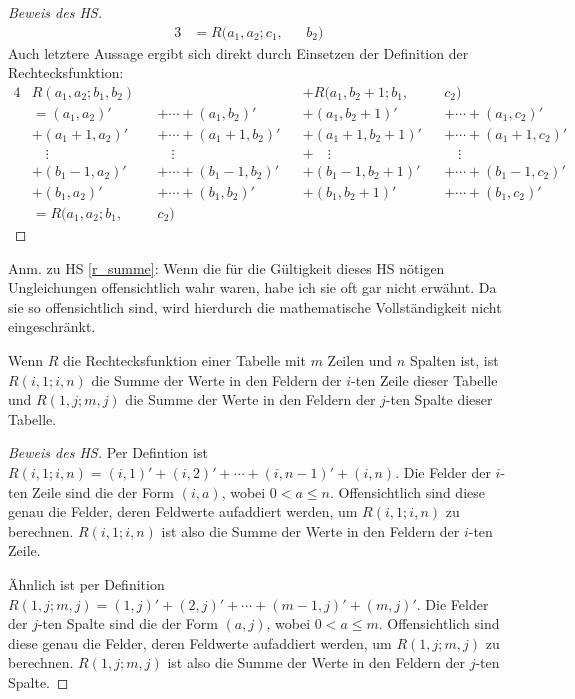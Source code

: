 \begin{proof}[Beweis des HS]
\begin{alignat*}{3}
        &=R(a_1, a_2; c_1, &&b_2)&&
    \end{alignat*}
    Auch letztere Aussage ergibt sich direkt durch Einsetzen der Definition der Rechtecksfunktion:
    \begin{alignat*}{4}
        &R(a_1, a_2; b_1, b_2)&& &&+R(a_1, b_2+1; b_1, &&c_2)\\
        &=(a_1, a_2)' &&+\cdots+ (a_1, b_2)'
        &&+(a_1, b_2+1)'&&+\cdots+(a_1, c_2)'\\
        &+(a_1+1, a_2)'&&+\cdots+ (a_1+1, b_2)'
        &&+(a_1+1, b_2+1)'&&+\cdots+(a_1+1, c_2)'\\
        & \quad\vdots&&\quad\vdots&&+\quad\vdots&&\quad\vdots\\
        &+(b_1-1, a_2)'&&+\cdots + (b_1-1, b_2)'
        &&+(b_1-1, b_2+1)'&&+\cdots+(b_1-1, c_2)'\\
        &+(b_1, a_2)'&&+ \cdots + (b_1, b_2)'
        &&+(b_1, b_2+1)'&&+\cdots+(b_1, c_2)'\\
        &=R(a_1, a_2; b_1, &&c_2)
    \end{alignat*}
\end{proof}
Anm.  zu HS \ref{r_summe}: Wenn die für die Gültigkeit dieses HS nötigen Ungleichungen offensichtlich wahr waren, 
habe ich sie oft gar nicht erwähnt. Da sie so offensichtlich sind, wird hierdurch die mathematische Vollständigkeit 
nicht eingeschränkt.
\begin{lem}\label{r_zeile_spalte}
    Wenn $R$ die Rechtecksfunktion einer Tabelle mit $m$ Zeilen und $n$ Spalten ist, ist $R(i, 1; i, n)$ die Summe 
    der Werte in den Feldern der $i$-ten Zeile dieser Tabelle und $R(1, j; m, j)$ die Summe der Werte in den Feldern 
    der $j$-ten Spalte dieser Tabelle.
\end{lem}
\begin{proof}[Beweis des HS]
    Per Defintion ist $R(i, 1; i, n)=(i, 1)'+(i, 2)'+\cdots+(i, n-1)'+(i, n)$. Die Felder der $i$-ten Zeile sind die 
    der Form $(i, a)$, wobei $0<a\leq n$. Offensichtlich sind diese genau die Felder, deren Feldwerte aufaddiert 
    werden, um $R(i, 1; i, n)$ zu berechnen. $R(i, 1; i, n)$ ist also die Summe der Werte in den Feldern der $i$-ten 
    Zeile.

    Ähnlich ist per Definition $R(1, j; m, j)=(1, j)'+(2, j)'+\cdots+(m-1, j)'+(m, j)'$. Die Felder der $j$-ten Spalte 
    sind die der Form $(a, j)$, wobei $0<a\leq m$. Offensichtlich sind diese genau die Felder, deren Feldwerte 
    aufaddiert werden, um $R(1, j; m, j)$ zu berechnen. $R(1, j; m, j)$ ist also die Summe der Werte in den Feldern 
    der $j$-ten Spalte.
\end{proof}
